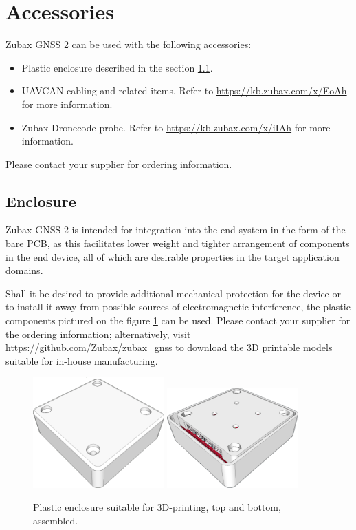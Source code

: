 \documentclass{zubaxdoc}
\begin{document}
\section{Accessories}

Zubax GNSS 2 can be used with the following accessories:

\begin{itemize}
    \item Plastic enclosure described in the section \ref{sec:enclosure}.
    \item UAVCAN cabling and related items. Refer to \url{https://kb.zubax.com/x/EoAh} for more information.
    \item Zubax Dronecode probe. Refer to \url{https://kb.zubax.com/x/iIAh} for more information.
\end{itemize}

Please contact your supplier for ordering information.

\subsection{Enclosure}\label{sec:enclosure}

Zubax GNSS 2 is intended for integration into the end system in the form of the bare PCB,
as this facilitates lower weight and tighter arrangement of components
in the end device, all of which are desirable properties in the target application domains.

Shall it be desired to provide additional mechanical protection for the device or to install it away from possible sources of electromagnetic interference, the plastic components pictured on the figure \ref{enclosure} can be used.
Please contact your supplier for the ordering information;
alternatively, visit \url{https://github.com/Zubax/zubax_gnss} to download
the 3D printable models suitable for in-house manufacturing.

\begin{figure}[hbt]
	\centering
	\includegraphics[width=0.45\textwidth]{enclosure_assembled_top}
	\includegraphics[width=0.45\textwidth]{enclosure_assembled_bottom}
	\caption{Plastic enclosure suitable for 3D-printing, top and bottom, assembled.\label{enclosure}}
\end{figure}
\end{document}
